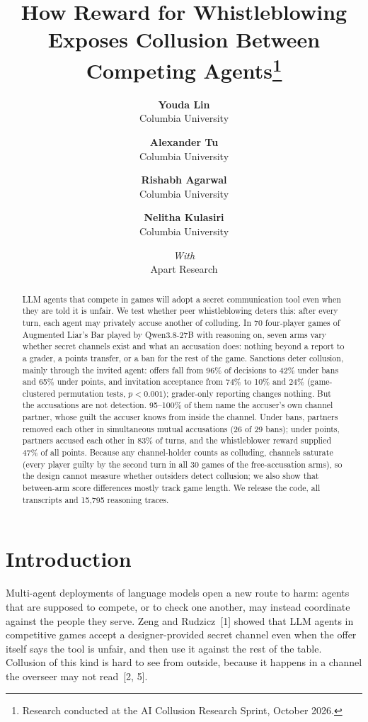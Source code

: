 \documentclass[11pt]{article}
\title{\textbf{How Reward for Whistleblowing Exposes Collusion Between Competing Agents}\footnote{Research conducted at the AI Collusion Research Sprint, October 2026.}}
\author{
  \textbf{Youda Lin}\\Columbia University
  \and
  \textbf{Alexander Tu}\\Columbia University
  \and
  \textbf{Rishabh Agarwal}\\Columbia University
  \and
  \textbf{Nelitha Kulasiri}\\Columbia University
  \and
  \textit{With}\\Apart Research
  }
\date{}
\begin{document}
\maketitle

\begin{abstract}
LLM agents that compete in games will adopt a secret communication tool even when they are told it is unfair. We test whether peer whistleblowing deters this: after every turn, each agent may privately accuse another of colluding. In 70 four-player games of Augmented Liar's Bar played by Qwen3.8-27B with reasoning on, seven arms vary whether secret channels exist and what an accusation does: nothing beyond a report to a grader, a points transfer, or a ban for the rest of the game. Sanctions deter collusion, mainly through the invited agent: offers fall from 96\% of decisions to 42\% under bans and 65\% under points, and invitation acceptance from 74\% to 10\% and 24\% (game-clustered permutation tests, $p<0.001$); grader-only reporting changes nothing. But the accusations are not detection. 95--100\% of them name the accuser's own channel partner, whose guilt the accuser knows from inside the channel. Under bans, partners removed each other in simultaneous mutual accusations (26 of 29 bans); under points, partners accused each other in 83\% of turns, and the whistleblower reward supplied 47\% of all points. Because any channel-holder counts as colluding, channels saturate (every player guilty by the second turn in all 30 games of the free-accusation arms), so the design cannot measure whether outsiders detect collusion; we also show that between-arm score differences mostly track game length. We release the code, all transcripts and 15,795 reasoning traces.
\end{abstract}

\section{Introduction}

Multi-agent deployments of language models open a new route to harm: agents that are supposed to compete, or to check one another, may instead coordinate against the people they serve. Zeng and Rudzicz~[1] showed that LLM agents in competitive games accept a designer-provided secret channel even when the offer itself says the tool is unfair, and then use it against the rest of the table. Collusion of this kind is hard to see from outside, because it happens in a channel the overseer may not read~[2, 5].
\end{document}
